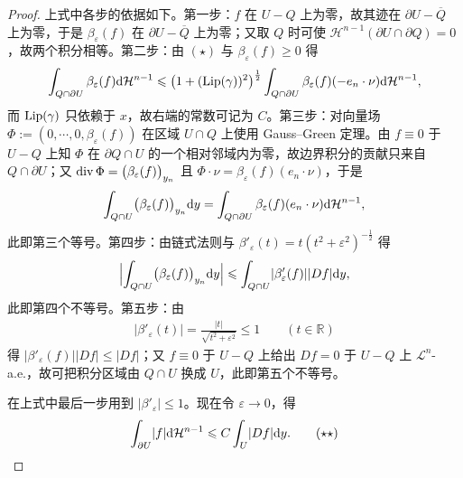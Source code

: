 \documentclass[../../main.tex]{subfiles}%
\begin{document}
\begin{proof}
上式中各步的依据如下。第一步：$f$ 在 $U-Q$ 上为零，故其迹在 $\partial U-\overline{Q}$ 上为零，于是 $\beta_\varepsilon(f)$ 在 $\partial U-\overline{Q}$ 上为零；又取 $Q$ 时可使 $\mathcal{H}^{n-1}(\partial U\cap\partial Q)=0$，故两个积分相等。第二步：由 $(\star)$ 与 $\beta_\varepsilon(f)\geqslant0$ 得
\begin{align*}
\int_{Q\cap\partial U}\beta_\varepsilon(f)\mathrm{d}\mathcal{H}^{n-1}\leqslant\bigl(1+(\operatorname{Lip}(\gamma))^2\bigr)^{\frac12}\int_{Q\cap\partial U}\beta_\varepsilon(f)(-e_n\cdot\nu)\mathrm{d}\mathcal{H}^{n-1},
\end{align*}
而 $\operatorname{Lip}(\gamma)$ 只依赖于 $x$，故右端的常数可记为 $C$。第三步：对向量场 $\Phi:=(0,\cdots,0,\beta_\varepsilon(f))$ 在区域 $U\cap Q$ 上使用 Gauss--Green 定理。由 $f\equiv0$ 于 $U-Q$ 上知 $\Phi$ 在 $\partial Q\cap U$ 的一个相对邻域内为零，故边界积分的贡献只来自 $Q\cap\partial U$；又 $\operatorname{div}\Phi=\bigl(\beta_\varepsilon(f)\bigr)_{y_n}$ 且 $\Phi\cdot\nu=\beta_\varepsilon(f)(e_n\cdot\nu)$，于是
\begin{align*}
\int_{Q\cap U}\bigl(\beta_\varepsilon(f)\bigr)_{y_n}\mathrm{d} y=\int_{Q\cap\partial U}\beta_\varepsilon(f)(e_n\cdot\nu)\mathrm{d}\mathcal{H}^{n-1},
\end{align*}
此即第三个等号。第四步：由链式法则与 $\beta'_\varepsilon(t)=t(t^2+\varepsilon^2)^{-\frac12}$ 得
\begin{align*}
\Bigl\lvert\int_{Q\cap U}\bigl(\beta_\varepsilon(f)\bigr)_{y_n}\mathrm{d} y\Bigr\rvert\leqslant\int_{Q\cap U}\lvert\beta'_\varepsilon(f)\rvert\lvert Df\rvert\mathrm{d} y ,
\end{align*}
此即第四个不等号。第五步：由
\begin{align*}
\lvert\beta'_\varepsilon(t)\rvert=\frac{\lvert t\rvert}{\sqrt{t^2+\varepsilon^2}}\leqslant1\qquad(t\in\mathbb{R})
\end{align*}
得 $\lvert\beta'_\varepsilon(f)\rvert\lvert Df\rvert\leqslant\lvert Df\rvert$；又 $f\equiv0$ 于 $U-Q$ 上给出 $Df=0$ 于 $U-Q$ 上 $\mathcal{L}^n$-a.e.，故可把积分区域由 $Q\cap U$ 换成 $U$，此即第五个不等号。

在上式中最后一步用到 $\lvert\beta'_\varepsilon\rvert\leqslant1$。现在令 $\varepsilon\to0$，得
\begin{align*}
\int_{\partial U}\lvert f\rvert\mathrm{d}\mathcal{H}^{n-1}\leqslant C\int_U\lvert Df\rvert\mathrm{d} y .\qquad(\star\star)
\end{align*}


\end{proof}
\end{document}
